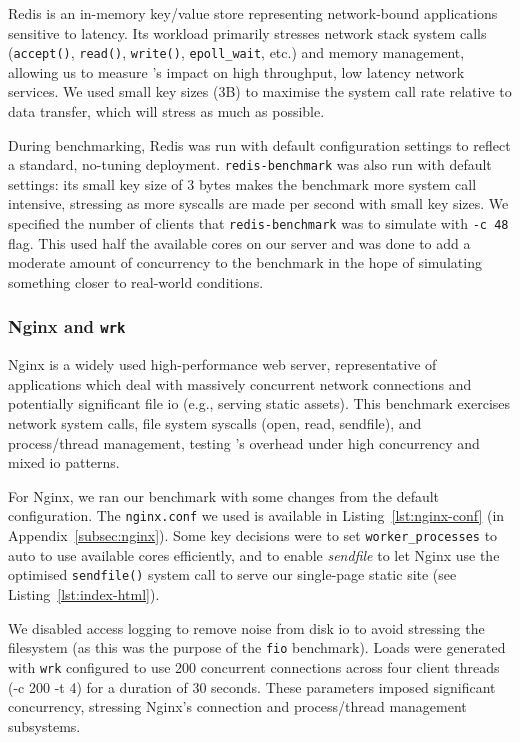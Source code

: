 Redis is an in-memory key/value store representing network-bound applications 
sensitive to latency. Its workload primarily stresses network stack system calls 
(\texttt{accept()}, \texttt{read()}, \texttt{write()}, \texttt{epoll\_wait}, 
etc.) and memory management, allowing us to measure  \af's impact on high 
throughput, low latency network services. We used small key sizes (3B) to 
maximise the system call rate relative to data transfer, which will stress \af as 
much as possible.

During benchmarking, Redis was run with default configuration settings to
reflect a standard, no-tuning deployment. \texttt{redis-benchmark} was also run
with default settings: its small key size of 3 bytes makes the benchmark more
system call intensive, stressing \af as more syscalls are
made per second with small key sizes. We specified the number of clients that
\texttt{redis-benchmark} was to simulate with \texttt{-c 48} flag. This used
half the available cores on our server and was done to add a moderate amount of
concurrency to the benchmark in the hope of simulating something closer to
real-world conditions.

\subsubsection{Nginx and \texttt{wrk}}\label{subsubsec:nginx-just}

Nginx is a widely used high-performance web server, representative of applications
which deal with massively concurrent network connections and potentially
significant file \ac{io} (e.g., serving static assets). This benchmark exercises
network system calls, file system syscalls (open, read, sendfile),
and process/thread management, testing \af's overhead under high concurrency
and mixed \ac{io} patterns.

For Nginx, we ran our benchmark with some changes from the
default configuration. The \texttt{nginx.conf} we used is available in
Listing~\ref{lst:nginx-conf} (in Appendix~\ref{subsec:nginx}). Some key 
decisions were to set \texttt{worker\_processes} to auto to use available cores 
efficiently, and to enable \textit{sendfile} to let Nginx use the optimised 
\texttt{sendfile()} system call to serve our single-page static site (see 
Listing~\ref{lst:index-html}).

We disabled access logging to remove noise from disk \ac{io} to avoid stressing
the filesystem (as this was the purpose of the \texttt{fio} benchmark).
Loads were generated with \texttt{wrk} configured to use 200 concurrent
connections across four client threads (-c 200 -t 4) for a duration of 30
seconds. These parameters imposed significant concurrency, stressing Nginx's
connection and process/thread management subsystems.

